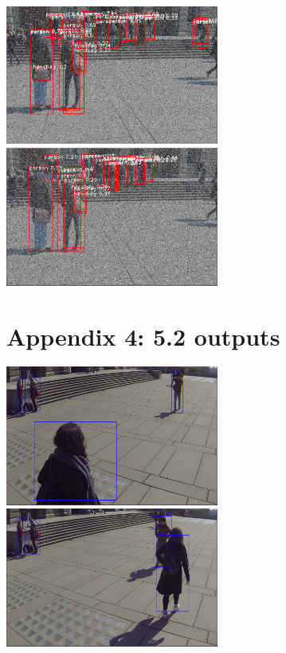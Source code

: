 \documentclass[12pt]{report}
\begin{document}
\includegraphics[width=70mm]{./images/appendix/NoConfidenceAug40.PNG}
\includegraphics[width=70mm]{./images/appendix/NoConfidenceAug50.PNG}

\section*{Appendix 4: 5.2 outputs}

\includegraphics[width=70mm]{./images/appendix/Video3output1.PNG}
\includegraphics[width=70mm]{./images/appendix/Video3output2.PNG}
\end{document}
